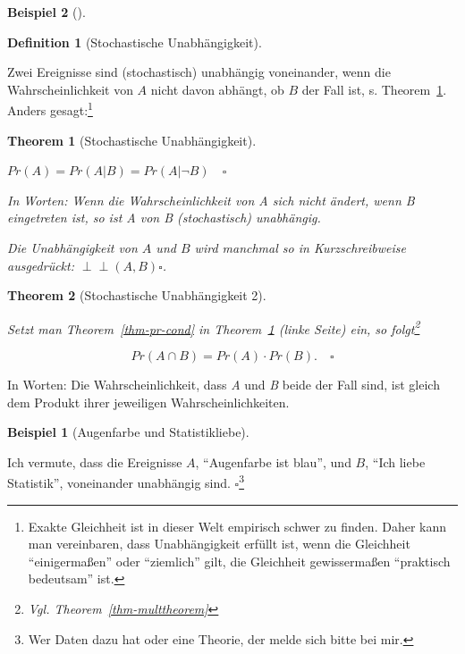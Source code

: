 \documentclass[
  ngerman,
  letterpaper,
  twoside,
  open=any]{scrbook}
\theoremstyle{definition}
\newtheorem{example}{Beispiel}[chapter]
\theoremstyle{plain}
\newtheorem{theorem}{Theorem}[chapter]
\theoremstyle{definition}
\theoremstyle{definition}
\newtheorem{definition}{Definition}[chapter]
\theoremstyle{remark}
\begin{document}
\begin{example}[]
\begin{definition}[Stochastische
Unabhängigkeit]\protect\hypertarget{def-indep}{}\label{def-indep}

Zwei Ereignisse sind (stochastisch) unabhängig voneinander, wenn die
Wahrscheinlichkeit von \(A\) nicht davon abhängt, ob \(B\) der Fall ist,
s. Theorem~\ref{thm-indep}. Anders gesagt:\footnote{Exakte Gleichheit
  ist in dieser Welt empirisch schwer zu finden. Daher kann man
  vereinbaren, dass Unabhängigkeit erfüllt ist, wenn die Gleichheit
  \enquote{einigermaßen} oder \enquote{ziemlich} gilt, die Gleichheit
  gewissermaßen \enquote{praktisch bedeutsam} ist.}

\end{definition}

\providecommand{\indep}{\perp \!\!\! \perp}

\begin{theorem}[Stochastische
Unabhängigkeit]\protect\hypertarget{thm-indep}{}\label{thm-indep}

\(Pr(A) = Pr(A|B) = Pr(A|\neg B) \quad \square\)

In Worten: Wenn die Wahrscheinlichkeit von \emph{A} sich nicht ändert,
wenn \emph{B} eingetreten ist, so ist \emph{A} von \emph{B}
(stochastisch) unabhängig.

Die Unabhängigkeit von \(A\) und \(B\) wird manchmal so in
Kurzschreibweise ausgedrückt: \(\perp \!\!\! \perp(A, B) \square\).

\end{theorem}

\begin{theorem}[Stochastische Unabhängigkeit
2]\protect\hypertarget{thm-indep2}{}\label{thm-indep2}

Setzt man Theorem~\ref{thm-pr-cond} in Theorem~\ref{thm-indep} (linke
Seite) ein, so folgt\footnote{Vgl. Theorem~\ref{thm-multtheorem}}

\[Pr(A \cap B) = Pr(A) \cdot Pr(B).\quad \square\]

\end{theorem}

In Worten: Die Wahrscheinlichkeit, dass \emph{A} und \emph{B} beide der
Fall sind, ist gleich dem Produkt ihrer jeweiligen Wahrscheinlichkeiten.

\begin{example}[Augenfarbe und
Statistikliebe]\protect\hypertarget{exm-indep1}{}\label{exm-indep1}

Ich vermute, dass die Ereignisse \(A\), \enquote{Augenfarbe ist blau},
und \(B\), \enquote{Ich liebe Statistik}, voneinander unabhängig sind.
\(\square\)\footnote{Wer Daten dazu hat oder eine Theorie, der melde
  sich bitte bei mir.}


\end{example}
\end{example}
\end{document}
